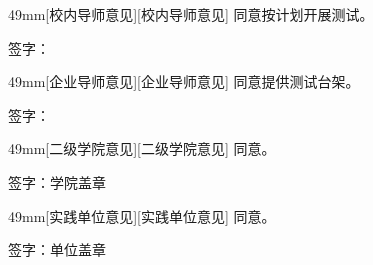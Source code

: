 \documentclass{sdjumpracticeplan}
\begin{document}
\clearpage
\begin{formbox}{49mm}[校内导师意见][校内导师意见]
同意按计划开展测试。\par\vfill
\begin{flushright}签字：\\\end{flushright}
\end{formbox}
\begin{formbox}{49mm}[企业导师意见][企业导师意见]
同意提供测试台架。\par\vfill
\begin{flushright}签字：\\\end{flushright}
\end{formbox}
\begin{formbox}{49mm}[二级学院意见][二级学院意见]
同意。\par\vfill
\begin{flushright}签字：\hspace{12mm}学院盖章\\\end{flushright}
\end{formbox}
\begin{formbox}{49mm}[实践单位意见][实践单位意见]
同意。\par\vfill
\begin{flushright}签字：\hspace{12mm}单位盖章\\\end{flushright}
\end{formbox}
\end{document}
